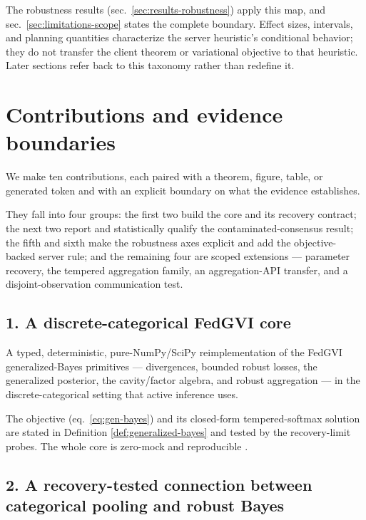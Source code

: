 \documentclass[
  english,
]{article}
\theoremstyle{plain}
\theoremstyle{definition}
\theoremstyle{remark}
\theoremstyle{definition}
\begin{document}
The robustness results (sec.~\ref{sec:results-robustness}) apply this
map, and sec.~\ref{sec:limitations-scope} states the complete boundary.
Effect sizes, intervals, and planning quantities characterize the server
heuristic's conditional behavior; they do not transfer the client
theorem or variational objective to that heuristic. Later sections refer
back to this taxonomy rather than redefine it.

\section{Contributions and evidence boundaries}\label{sec:contributions}

We make ten contributions, each paired with a theorem, figure, table, or
generated token and with an explicit boundary on what the evidence
establishes.

They fall into four groups: the first two build the core and its
recovery contract; the next two report and statistically qualify the
contaminated-consensus result; the fifth and sixth make the robustness
axes explicit and add the objective-backed server rule; and the
remaining four are scoped extensions --- parameter recovery, the
tempered aggregation family, an aggregation-API transfer, and a
disjoint-observation communication test.

\subsection{1. A discrete-categorical FedGVI
core}\label{a-discrete-categorical-fedgvi-core}

A typed, deterministic, pure-NumPy/SciPy reimplementation of the FedGVI
\citep{mildner2025fedgvi} generalized-Bayes primitives --- divergences,
bounded robust losses, the generalized posterior, the cavity/factor
algebra, and robust aggregation --- in the discrete-categorical setting
that active inference \citep{dacosta2020active} uses.

The objective (eq.~\ref{eq:gen-bayes}) and its closed-form
tempered-softmax solution are stated in Definition
\ref{def:generalized-bayes} and tested by the recovery-limit probes. The
whole core is zero-mock and reproducible \citep{peng2011reproducible}.

\subsection{2. A recovery-tested connection between categorical pooling
and robust
Bayes}\label{a-recovery-tested-connection-between-categorical-pooling-and-robust-bayes}
\end{document}

